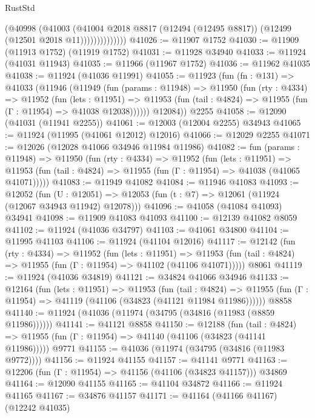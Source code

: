 \begin{lexlean}{RustStd}
\begin{coremodule}
                      (@40998
                        (@41003
                          (@41004
                            @2018
                            @8817
                            (@12494 (@12495 @8817))
                            (@12499 (@12501 @2018 @11))))))))))))))
@41026 := @11907 @1752
@41030 := @11909 (@11913 @1752) (@11919 @1752)
@41031 := @11928 @34940
@41033 := @11924 (@41031 @11943)
@41035 := @11966 (@11967 @1752)
@41036 := @11962 @41035
@41038 := @11924 (@41036 @11991)
@41055 := @11923
    (fun (fn : @131) =>
    @41033
      (@11946
        (@11949
          (fun (params : @11948) =>
          @11950
            (fun (rty : @4334) =>
            @11952
              (fun (lets : @11951) =>
              @11953 (fun (tail : @4824) => @11955 (fun (Γ : @11954) => @41038 @12038))))))
        @12084))
    @2255
@41058 := @12090 (@41031 (@11941 @2255))
@41061 := @12003 (@12004 @2255) @34943
@41065 := @11924 (@11995 (@41061 @12012) @12016)
@41066 := @12029 @2255
@41071 := @12026 (@12028 @41066 @34946 @11984 @11986)
@41082 := fun (params : @11948) =>
  @11950
    (fun (rty : @4334) =>
    @11952
      (fun (lets : @11951) =>
      @11953 (fun (tail : @4824) => @11955 (fun (Γ : @11954) => @41038 (@41065 @41071)))))
@41083 := @11949 @41082
@41084 := @11946 @41083
@41093 := @12052
    (fun (U : @12051) => @12053 (fun (t : @7) => @12061 (@11924 (@12067 @34943 @11942) @12078)))
@41096 := @41058 (@41084 @41093) @34941
@41098 := @11909 @41083 @41093
@41100 := @12139 @41082 @8059
@41102 := @11924 (@41036 @34797)
@41103 := @41061 @34800
@41104 := @11995 @41103
@41106 := @11924 (@41104 @12016)
@41117 := @12142
    (fun (rty : @4334) =>
    @11952
      (fun (lets : @11951) =>
      @11953 (fun (tail : @4824) => @11955 (fun (Γ : @11954) => @41102 (@41106 @41071)))))
    @8061
@41119 := @11924 (@41036 @34819)
@41121 := @34824 @41066 @34946
@41133 := @12164
    (fun (lets : @11951) =>
    @11953
      (fun (tail : @4824) =>
      @11955 (fun (Γ : @11954) => @41119 (@41106 (@34823 (@41121 @11984 @11986))))))
    @8858
@41140 := @11924 (@41036 (@11974 (@34795 (@34816 (@11983 (@8859 @11986))))))
@41141 := @41121 @8858
@41150 := @12188
    (fun (tail : @4824) => @11955 (fun (Γ : @11954) => @41140 (@41106 (@34823 (@41141 @11986)))))
    @9771
@41155 := @41036 (@11974 (@34795 (@34816 (@11983 @9772))))
@41156 := @11924 @41155
@41157 := @41141 @9771
@41163 := @12206 (fun (Γ : @11954) => @41156 (@41106 (@34823 @41157))) @34869
@41164 := @12090 @41155
@41165 := @41104 @34872
@41166 := @11924 @41165
@41167 := @34876 @41157
@41171 := @41164 (@41166 @41167) (@12242 @41035)

\end{coremodule}
\end{lexlean}
